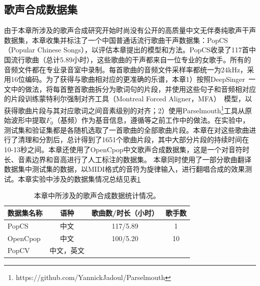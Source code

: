 \subsection{歌声合成数据集}
由于本章所涉及的歌声合成研究开始时尚没有公开的高质量中文无伴奏纯歌声干声数据集，本章收集并标注了一个中国普通话流行歌曲干声数据集：PopCS（Popular Chinese Songs），以评估本章提出的模型和方法。PopCS收录了117首中国流行歌曲（总计5.89小时），这些歌曲的干声都来自一位专业的女歌手。所有的音频文件都在专业录音室中录制。每首歌曲的音频文件采样率都统一为24kHz，采用16位编码。为了获得与歌曲相对应的更准确的乐谱，本章1）按照DeepSinger~\citep{ren2020deepsinger}一文中的做法，将每首整首歌曲拆分为歌词句的片段，并使用这些句子和音频相对应的片段训练蒙特利尔强制对齐工具（Montreal Forced Aligner，MFA）~\citep{mcauliffe2017montreal}模型，以获得歌曲片段与其对应歌词之间音素级别的对齐；2）使用Parselmouth\footnote{https://github.com/YannickJadoul/Parselmouth}工具从原始波形中提取$F_0$（基频）作为基音信息，遵循\citet{wu2020adversarially,blaauw2020sequence,ren2020deepsinger}等之前工作中的做法。在实验中，测试集和验证集都是各随机选取了一首歌曲的全部歌曲片段。本章在对这些歌曲进行了清理和分割后，总计得到了1651个歌曲片段，其中大部分片段的持续时间在10-13秒之间。本章还使用了OpenCpop\citep{opencpop}中文歌声合成数据集，这是一个对音符时长、音素边界和音高进行了人工标注的数据集。
本章同时使用了一部分歌曲翻译数据集中测试集的数据，以MIDI格式的音符为旋律输入，进行翻唱合成的效果测试。本章实验中涉及的数据集情况总结见表\ref{tab:svs_data}
\begin{table}
	\centering
	\setlength{\belowcaptionskip}{8pt} %
	\caption{本章中所涉及的歌声合成数据统计情况。}
	\begin{tabular}{|l|c|c|c|}
	\hline
	 \textbf{数据集名称} & \textbf{语种} & \textbf{歌曲数/时长（小时）} & \textbf{歌手数}\\
	\hline
	 PopCS & 中文 & 117/5.89 & 1 \\
	\hline
	 OpenCpop & 中文 & 100/5.20 & 10 \\
	\hline
	 PopCV & 中文，英文 & \diagbox[]{}{} & \diagbox[]{}{} \\
	\hline
	\end{tabular}
	\label{tab:svs_data}
\end{table}
